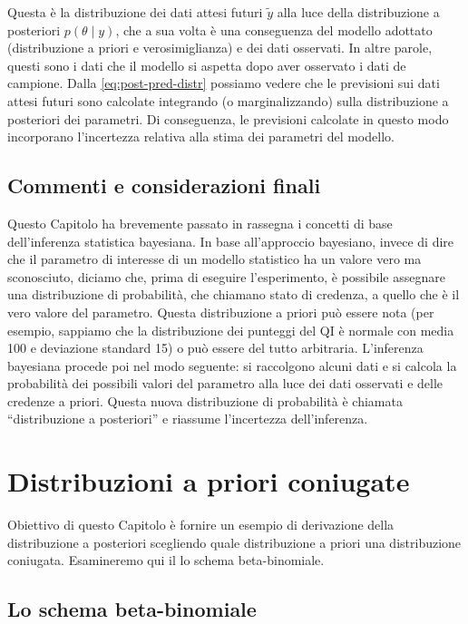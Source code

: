 \documentclass[
  11pt,
]{krantz}
\theoremstyle{definition}
\theoremstyle{definition}
\theoremstyle{definition}
\theoremstyle{definition}
\theoremstyle{remark}
\begin{document}
Questa è la distribuzione dei dati attesi futuri \(\tilde{y}\) alla luce della distribuzione a posteriori \(p(\theta \mid y)\), che a sua volta è una conseguenza del modello adottato (distribuzione a priori e verosimiglianza) e dei dati osservati. In altre parole, questi sono i dati che il modello si aspetta dopo aver osservato i dati de campione. Dalla \eqref{eq:post-pred-distr} possiamo vedere che le previsioni sui dati attesi futuri sono calcolate integrando (o marginalizzando) sulla distribuzione a posteriori dei parametri. Di conseguenza, le previsioni calcolate in questo modo incorporano l'incertezza relativa alla stima dei parametri del modello.

\hypertarget{commenti-e-considerazioni-finali}{%
\section*{Commenti e considerazioni finali}\label{commenti-e-considerazioni-finali}}


Questo Capitolo ha brevemente passato in rassegna i concetti di base dell'inferenza statistica bayesiana. In base all'approccio bayesiano, invece di dire che il parametro di interesse di un modello statistico ha un valore vero ma sconosciuto, diciamo che, prima di eseguire l'esperimento, è possibile assegnare una distribuzione di probabilità, che chiamano stato di credenza, a quello che è il vero valore del parametro. Questa distribuzione a priori può essere nota (per esempio, sappiamo che la distribuzione dei punteggi del QI è normale con media 100 e deviazione standard 15) o può essere del tutto arbitraria. L'inferenza bayesiana procede poi nel modo seguente: si raccolgono alcuni dati e si calcola la probabilità dei possibili valori del parametro alla luce dei dati osservati e delle credenze a priori. Questa nuova distribuzione di probabilità è chiamata ``distribuzione a posteriori'' e riassume l'incertezza dell'inferenza.

\hypertarget{chapter-distr-coniugate}{%
\chapter{Distribuzioni a priori coniugate}\label{chapter-distr-coniugate}}

Obiettivo di questo Capitolo è fornire un esempio di derivazione della distribuzione a posteriori scegliendo quale distribuzione a priori una distribuzione coniugata. Esamineremo qui il lo schema beta-binomiale.

\hypertarget{chapter-distr-priori-coniugate}{%
\section{Lo schema beta-binomiale}\label{chapter-distr-priori-coniugate}}
\end{document}
